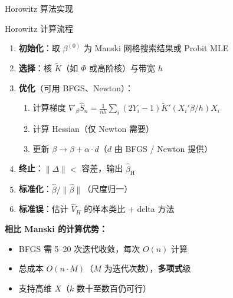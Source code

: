 \documentclass[aspectratio=169, 10pt]{beamer}
\begin{document}
\begin{frame}{Horowitz 算法实现}

  \begin{examplebox}{{Horowitz 计算流程}}
    \begin{enumerate}\setlength{\itemsep}{1pt}
      \item \textbf{初始化}：取 $\beta^{(0)}$ 为 Manski 网格搜索结果或 Probit MLE
      \item \textbf{选择}：核 $\tilde K$（如 $\Phi$ 或高阶核）与带宽 $h$
      \item \textbf{优化}（可用 BFGS、Newton）：
      \begin{enumerate}\setlength{\itemsep}{1pt}
        \item 计算梯度 $\nabla_\beta \hat S_n = \tfrac{1}{nh}\sum_i (2Y_i-1) \tilde K'(X_i'\beta/h) X_i$
        \item 计算 Hessian（仅 Newton 需要）
        \item 更新 $\beta \to \beta + \alpha \cdot d$（$d$ 由 BFGS / Newton 提供）
      \end{enumerate}
      \item \textbf{终止}：$\|\Delta\| < $ 容差，输出 $\hat\beta_{\text{H}}$
      \item \textbf{标准化}：$\hat\beta / \|\hat\beta\|$（尺度归一）
      \item \textbf{标准误}：估计 $\hat V_H$ 的样本类比 + delta 方法
    \end{enumerate}
  \end{examplebox}

  \begin{keybox}
    \textbf{相比 Manski 的计算优势：}
    \begin{itemize}\setlength{\itemsep}{1pt}
      \item BFGS 需 5--20 次迭代收敛，每次 $O(n)$ 计算
      \item 总成本 $O(n \cdot M)$（$M$ 为迭代次数），\textbf{多项式}级
      \item 支持高维 $X$（$k$ 数十至数百仍可行）
    \end{itemize}
  \end{keybox}

\end{frame}
\end{document}
